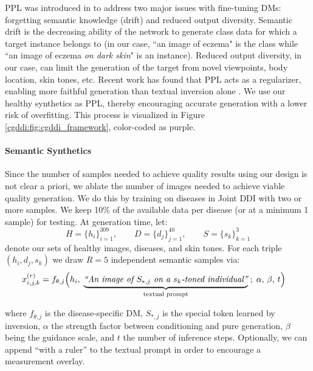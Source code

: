 \documentclass[11pt]{ucthesis}
\begin{document}
PPL was introduced in \cite{ruiz-2023} to address two major issues with fine-tuning DMs: forgetting semantic knowledge (drift) and reduced output diversity. Semantic drift is the decreasing ability of the network to generate class data for which a target instance belongs to (in our case, ``an image of eczema" is the class while ``an image of eczema \textit{on dark skin}" is an instance). Reduced output diversity, in our case, can limit the generation of the target from novel viewpoints, body location, skin tones, etc. Recent work has found that PPL acts as a regularizer, enabling more faithful generation than textual inversion alone \cite{zeng-2024}. We use our healthy synthetics as PPL, thereby encouraging accurate generation with a lower risk of overfitting. This process is visualized in Figure \ref{cgddi:fig:cgddi_framework}, color-coded as purple.

\paragraph{Semantic Synthetics} Since the number of samples needed to achieve quality results using our design is not clear a priori, we ablate the number of images needed to achieve viable quality generation. We do this by training on diseases in Joint DDI with two or more samples. We keep 10\% of the available data per disease (or at a minimum 1 sample) for testing. At generation time, let:
\begin{equation}
H=\{h_i\}_{i=1}^{309},\qquad
D=\{d_j\}_{j=1}^{40},\qquad
S=\{s_k\}_{k=1}^{3}
\end{equation}
denote our sets of healthy images, diseases, and skin tones. For each triple $(h_i, d_j, s_k)$ we draw $R=5$ independent semantic samples via:
\begin{equation}
  \begin{split}
    x_{i,j,k}^{(r)}
    &= f_{\theta,j}\Bigl(
         h_i,\;
         \underbrace{%
           \textit{“An image of }S_{*,j}\textit{ on a }s_k\textit{-toned individual”}%
         }_{\text{textual prompt}}
         \;;\;\alpha,\,\beta,\,t
      \Bigr)
  \end{split}
\end{equation}

where $f_{\theta,j}$ is the disease-specific DM, $S_{*,j}$ is the special token learned by inversion, $\alpha$ the strength factor between conditioning and pure generation, $\beta$ being the guidance scale, and $t$ the number of inference steps. Optionally, we can append “with a ruler” to the textual prompt in order to encourage a measurement overlay.
\end{document}
